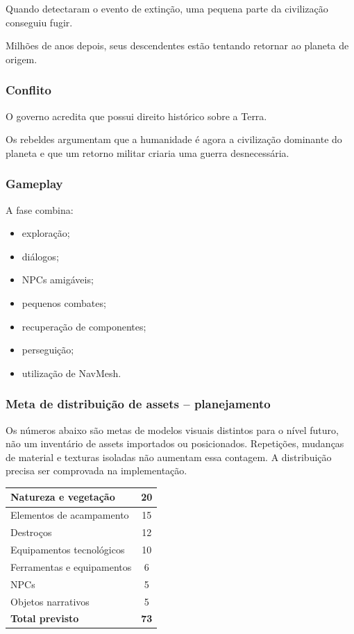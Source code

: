 \documentclass[12pt,a4paper]{article}
\begin{document}
Quando detectaram o evento de extinção, uma pequena parte da
civilização conseguiu fugir.

Milhões de anos depois, seus descendentes estão tentando retornar ao
planeta de origem.

\subsubsection*{Conflito}

O governo acredita que possui direito histórico sobre a Terra.

Os rebeldes argumentam que a humanidade é agora a civilização
dominante do planeta e que um retorno militar criaria uma guerra
desnecessária.

\subsubsection*{Gameplay}

A fase combina:

\begin{itemize}
    \item exploração;
    \item diálogos;
    \item NPCs amigáveis;
    \item pequenos combates;
    \item recuperação de componentes;
    \item perseguição;
    \item utilização de NavMesh.
\end{itemize}

\subsubsection*{Meta de distribuição de assets -- planejamento}

Os números abaixo são metas de modelos visuais distintos para o
nível futuro, não um inventário de assets importados ou posicionados.
Repetições, mudanças de material e texturas isoladas não aumentam
essa contagem. A distribuição precisa ser comprovada na implementação.


\begin{center}
\begin{tabularx}{\textwidth}{|X|c|}
\hline
Natureza e vegetação & 20\\
\hline
Elementos de acampamento & 15\\
\hline
Destroços & 12\\
\hline
Equipamentos tecnológicos & 10\\
\hline
Ferramentas e equipamentos & 6\\
\hline
NPCs & 5\\
\hline
Objetos narrativos & 5\\
\hline
\textbf{Total previsto} & \textbf{73}\\
\hline
\end{tabularx}
\end{center}
\end{document}
